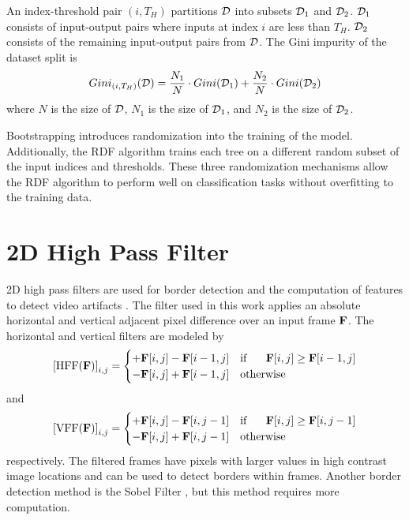 An index-threshold pair $(i,T_H)$ partitions $\mathcal{D}$ into subsets $\mathcal{D}_1$ and $\mathcal{D}_2$. $\mathcal{D}_1$ consists of input-output pairs where inputs at index $i$ are less than $T_H$. $\mathcal{D}_2$ consists of the remaining input-output pairs from $\mathcal{D}$. The Gini impurity of the dataset split is
%
\begin{equation}
  \label{eq:gini}
  Gini_{(i,T_H)}(\mathcal{D}) = \frac{N_1}{N}\cdot Gini(\mathcal{D}_1) + \frac{N_2}{N}\cdot Gini(\mathcal{D}_2)
\end{equation}
%
where $N$ is the size of $\mathcal{D}$, $N_1$ is the size of $\mathcal{D}_1$, and $N_2$ is the size of $\mathcal{D}_2$.

Bootstrapping introduces randomization into the training of the model. Additionally, the RDF algorithm trains each tree on a different random subset of the input indices and thresholds. These three randomization mechanisms allow the RDF algorithm to perform well on classification tasks without overfitting to the training data.

\section{2D High Pass Filter}
\label{sec:2d_filter}

2D high pass filters are used for border detection and the computation of features to detect video artifacts \cite{Glavota2016, Vranjes2018}. The filter used in this work applies an absolute horizontal and vertical adjacent pixel difference over an input frame $\mathbf{F}$. The horizontal and vertical filters are modeled by
%
\def\HFF{\text{HFF}}
\def\VFF{\text{VFF}}
\begin{equation}
  \label{eq:hf}
  \left[\HFF(\mat{F})\right]_{i,j} =
  \begin{cases}
    + \mat{F}[i,j] - \mat{F}[i-1,j] & \text{if \hspace{0.5cm}} \mat{F}[i,j] \ge \mat{F}[i-1,j] \\
    - \mat{F}[i,j] + \mat{F}[i-1,j] & \text{otherwise}
  \end{cases}
\end{equation}
%
and
%
\begin{equation}
  \label{eq:vf}
  \left[\VFF(\mat{F})\right]_{i,j} =
  \begin{cases}
    + \mat{F}[i,j] - \mat{F}[i,j-1] & \text{if \hspace{0.5cm}} \mat{F}[i,j] \ge \mat{F}[i,j-1] \\
    - \mat{F}[i,j] + \mat{F}[i,j-1] & \text{otherwise}
  \end{cases}
\end{equation}
%
respectively. The filtered frames have pixels with larger values in high contrast image locations and can be used to detect borders within frames. Another border detection method is the Sobel Filter \cite{Korhonen2018}, but this method requires more computation.

